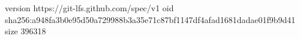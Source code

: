 version https://git-lfs.github.com/spec/v1
oid sha256:a948fa3b0e95d50a729988b3a35e71c87bf1147df4afad1681dadae01f9b9d41
size 396318
